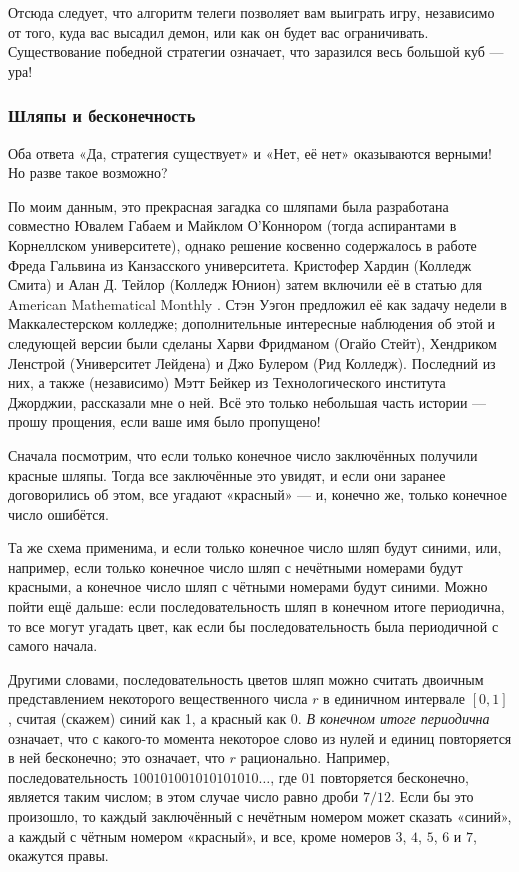 Отсюда следует, что алгоритм телеги позволяет вам выиграть игру, независимо от того, куда вас высадил демон, или как он будет вас ограничивать.
Существование победной стратегии означает, что заразился весь большой куб --- ура!

\subsubsection*{Шляпы и бесконечность}

Оба ответа «Да, стратегия существует» и «Нет, её нет» оказываются верными!
Но разве такое возможно?

По моим данным, это прекрасная загадка со шляпами была разработана совместно Ювалем Габаем и Майклом О'Коннором (тогда аспирантами в Корнеллском университете), однако решение косвенно содержалось в работе Фреда Гальвина из Канзасского университета.
Кристофер Хардин (Колледж Смита) и Алан Д. Тейлор (Колледж Юнион) затем включили её в статью для American Mathematical Monthly \cite{36}.
Стэн Уэгон предложил её как задачу недели в Маккалестерском колледже; дополнительные интересные наблюдения об этой и следующей версии были сделаны Харви Фридманом (Огайо Стейт), Хендриком Ленстрой (Университет Лейдена) и Джо Булером (Рид Колледж).
Последний из них, а также (независимо) Мэтт Бейкер из Технологического института Джорджии, рассказали мне о ней.
Всё это только небольшая часть истории --- прошу прощения, если ваше имя было пропущено!

Сначала посмотрим, что если только конечное число заключённых получили красные шляпы.
Тогда все заключённые это увидят, и если они заранее договорились об этом, все угадают «красный» --- и, конечно же, только конечное число ошибётся.

Та же схема применима, и если только конечное число шляп будут синими, или, например, если только конечное число шляп с нечётными номерами будут красными, а конечное число шляп с чётными номерами будут синими.
Можно пойти ещё дальше: если последовательность шляп в конечном итоге периодична, то все могут угадать цвет, как если бы последовательность была периодичной с самого начала.

Другими словами, последовательность цветов шляп можно считать двоичным представлением некоторого вещественного числа $r$ в единичном интервале $[0,1]$, считая (скажем) синий как 1, а красный как 0.
\emph{В конечном итоге периодична} означает, что с какого-то момента некоторое слово из нулей и единиц повторяется в ней бесконечно;
это означает, что $r$ рационально.
Например, последовательность $100101001010101010\dots$, где $01$ повторяется бесконечно, является таким числом; в этом случае число равно дроби $7/12$.
Если бы это произошло, то каждый заключённый с нечётным номером может сказать «синий», а каждый с чётным номером «красный», и все, кроме номеров $3$, $4$, $5$, $6$ и $7$, окажутся правы.

